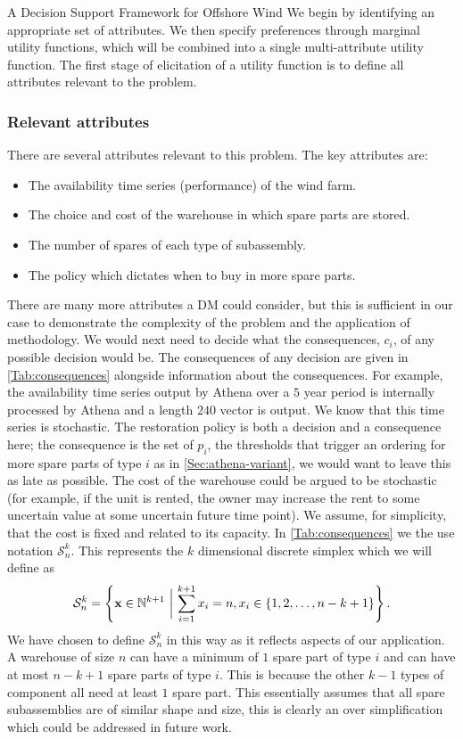 \begin{chapter}{A Decision Support Framework for Offshore Wind \label{Ch:ds-for-ow}}
We begin by identifying an appropriate set of attributes. We then specify preferences through marginal utility functions, which will be combined into a single multi-attribute utility function. The first stage of elicitation of a utility function is to define all attributes relevant to the problem.

\subsubsection{Relevant attributes}

There are several attributes relevant to this problem. The key attributes are:
\begin{itemize}
 \item The availability time series (performance) of the wind farm.
 \item The choice and cost of the warehouse in which spare parts are stored.
 \item The number of spares of each type of subassembly.
 \item The policy which dictates when to buy in more spare parts.
\end{itemize}
There are many more attributes a DM could consider, but this is sufficient in our case to demonstrate the complexity of the problem and the application of methodology. We would next need to decide what the consequences, $c_i$, of any possible decision would be. The consequences of any decision are given in \cref{Tab:consequences} alongside information about the consequences. For example, the availability time series output by Athena over a $5$ year period is internally processed by Athena and a length $240$ vector is output. We know that this time series is stochastic. The restoration policy is both a decision and a consequence here; the consequence is the set of $p_i$, the thresholds that trigger an ordering for more spare parts of type $i$ as in \cref{Sec:athena-variant}, we would want to leave this as late as possible. The cost of the warehouse could be argued to be stochastic (for example, if the unit is rented, the owner may increase the rent to some uncertain value at some uncertain future time point). We assume, for simplicity, that the cost is fixed and related to its capacity. In \cref{Tab:consequences} we the use notation $\mathcal{S}^k_n$. This represents the $k$ dimensional discrete simplex which we will define as
\begin{equation}
 \mathcal{S}^k_n = \left\{\mathbf{x} \in \mathbb{N}^{k+1} \,\,\bigg|\, \sum_{i=1}^{k+1} x_i = n, x_i \in \{1, 2, \ldots, n-k+1\} \right\}. \label{Eq:disc-simplex}
\end{equation}
We have chosen to define $\mathcal{S}^k_n$ in this way as it reflects aspects of our application. A warehouse of size $n$ can have a minimum of $1$ spare part of type $i$ and can have at most $n-k+1$ spare parts of type $i$. This is because the other $k-1$ types of component all need at least $1$ spare part. This essentially assumes that all spare subassemblies are of similar shape and size, this is clearly an over simplification which could be addressed in future work.


\end{chapter}
